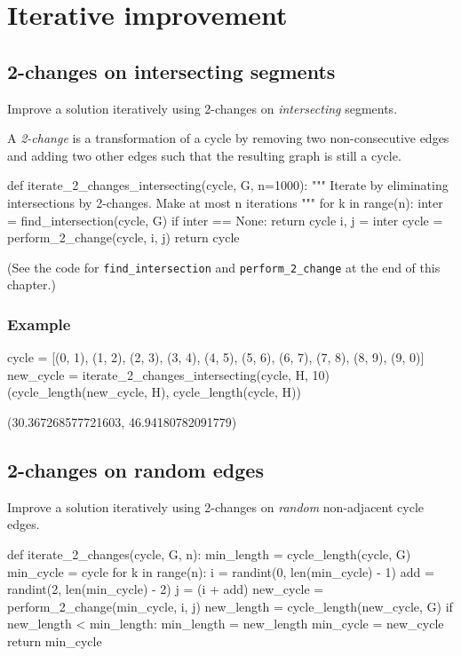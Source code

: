 \section{Iterative improvement}

\subsection{2-changes on intersecting segments}

Improve a solution iteratively using 2-changes on \emph{intersecting} segments.

A \emph{2-change} is a transformation of a cycle by removing two non-consecutive edges and adding two other edges such that the resulting graph is still a cycle.

\medskip
\begin{sageCell}
def iterate_2_changes_intersecting(cycle, G, n=1000):
    """
    Iterate by eliminating intersections by 2-changes. Make at most n iterations
    """
    for k in range(n):
        inter = find_intersection(cycle, G)
        if inter == None:
            return cycle
        i, j = inter
        cycle = perform_2_change(cycle, i, j)
    return cycle
\end{sageCell}
(See the code for \verb`find_intersection` and \verb`perform_2_change` at the end of this chapter.)

\subsubsection*{Example}

\begin{sageCell}
    cycle = [(0, 1), (1, 2), (2, 3), (3, 4), (4, 5), (5, 6), (6, 7), (7, 8), (8, 9),
      (9, 0)]
    new_cycle = iterate_2_changes_intersecting(cycle, H, 10)
    (cycle_length(new_cycle, H), cycle_length(cycle, H))
\end{sageCell}
\begin{outCell}
    (30.367268577721603, 46.94180782091779)
\end{outCell}

\subsection{2-changes on random edges}

Improve a solution iteratively using 2-changes on \emph{random}
non-adjacent cycle edges.

\medskip
\begin{sageCell}
def iterate_2_changes(cycle, G, n):
    min_length = cycle_length(cycle, G)
    min_cycle = cycle
    for k in range(n):
        i = randint(0, len(min_cycle) - 1)
        add = randint(2, len(min_cycle) - 2)
        j = (i + add) %
        new_cycle = perform_2_change(min_cycle, i, j)
        new_length = cycle_length(new_cycle, G)
        if new_length < min_length:
            min_length = new_length
            min_cycle = new_cycle
    return min_cycle
\end{sageCell}

